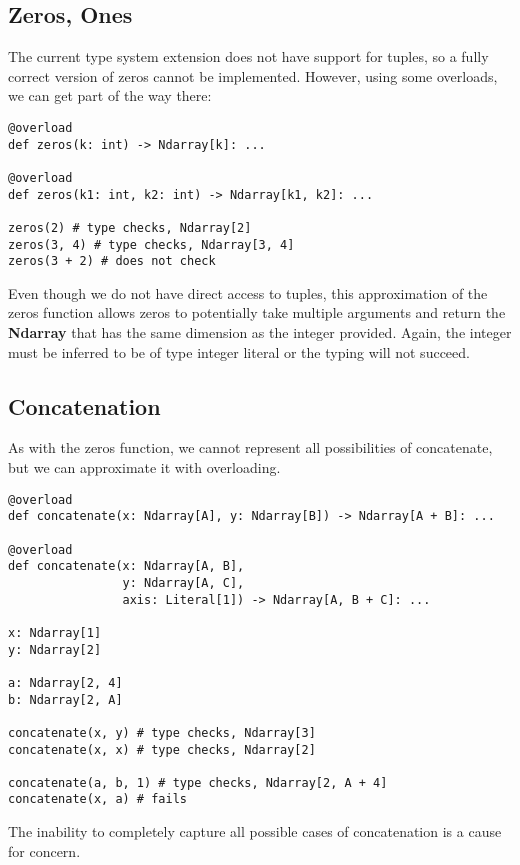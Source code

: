 \documentclass[12pt]{report}
\begin{document}
\subsection{Zeros, Ones}
The current type system extension does not have support for tuples, so a fully correct version of zeros cannot be implemented. However, using some overloads, we can get part of the way there:

\begin{singlespace*}
    \begin{verbatim}
@overload
def zeros(k: int) -> Ndarray[k]: ...

@overload
def zeros(k1: int, k2: int) -> Ndarray[k1, k2]: ...

zeros(2) # type checks, Ndarray[2]
zeros(3, 4) # type checks, Ndarray[3, 4]
zeros(3 + 2) # does not check\end{verbatim}
\end{singlespace*}
Even though we do not have direct access to tuples, this approximation of the zeros function allows zeros to potentially take multiple arguments and return the \textbf{Ndarray} that has the same dimension as the integer provided. Again, the integer must be inferred to be of type integer literal or the typing will not succeed.

\subsection{Concatenation}
As with the zeros function, we cannot represent all possibilities of concatenate, but we can approximate it with overloading.

\begin{singlespace*}
    \begin{verbatim}
@overload
def concatenate(x: Ndarray[A], y: Ndarray[B]) -> Ndarray[A + B]: ...

@overload
def concatenate(x: Ndarray[A, B],
                y: Ndarray[A, C],
                axis: Literal[1]) -> Ndarray[A, B + C]: ...

x: Ndarray[1]
y: Ndarray[2]

a: Ndarray[2, 4]
b: Ndarray[2, A]

concatenate(x, y) # type checks, Ndarray[3]
concatenate(x, x) # type checks, Ndarray[2]

concatenate(a, b, 1) # type checks, Ndarray[2, A + 4]
concatenate(x, a) # fails\end{verbatim}
\end{singlespace*}
The inability to completely capture all possible cases of concatenation is a cause for concern.
\end{document}
